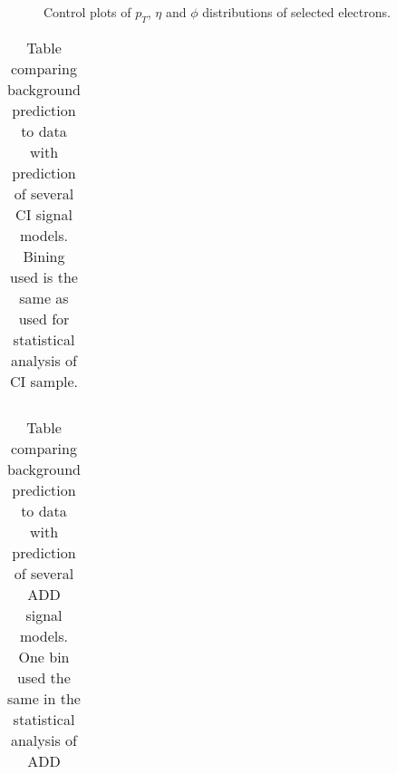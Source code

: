 	\begin{figure}[h]
	    \begin{center}
	    \end{center}
	   \caption{Control plots of $p_{T}$, $\eta$ and $\phi$ distributions of selected electrons.}
	   \label{fig:C5_sub_iso_efficiency}
	\end{figure}


	\begin {table}[h]
		\begin{center}
		\begin{tabular}{ | l | c | c | c | } 
			\hline
			
	    	\hline
	  	\end{tabular}
	  	\label{tab:det_res}
	  	\caption{Table comparing background prediction to data with prediction of several CI signal models. Bining used is the same as used for statistical analysis of CI sample.}
	  	\end{center}
	\end {table}

	\begin {table}[h]
		\begin{center}
		\begin{tabular}{ | l | c | c | c | } 
			\hline
			
	    	\hline
	  	\end{tabular}
	  	\label{tab:det_res}
	  	\caption{Table comparing background prediction to data with prediction of several ADD signal models. One bin used the same in the statistical analysis of ADD}
	  	\end{center}
	\end {table}















